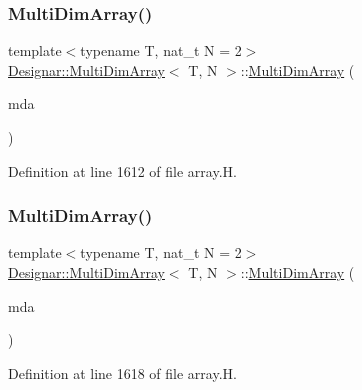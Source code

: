 \subsubsection{\texorpdfstring{Multi\+Dim\+Array()}{MultiDimArray()}\hspace{0.1cm}{\footnotesize\ttfamily [3/4]}}
{\footnotesize\ttfamily template$<$typename T, nat\+\_\+t N = 2$>$ \\
\hyperlink{class_designar_1_1_multi_dim_array}{Designar\+::\+Multi\+Dim\+Array}$<$ T, N $>$\+::\hyperlink{class_designar_1_1_multi_dim_array}{Multi\+Dim\+Array} (\begin{DoxyParamCaption}\item[{const \hyperlink{class_designar_1_1_multi_dim_array}{Multi\+Dim\+Array}$<$ T, N $>$ \&}]{mda }\end{DoxyParamCaption})\hspace{0.3cm}{\ttfamily [inline]}}



Definition at line 1612 of file array.\+H.

\mbox{\label{class_designar_1_1_multi_dim_array_aaa91d894b0e4065cba28a9066c0513b8}} 
\subsubsection{\texorpdfstring{Multi\+Dim\+Array()}{MultiDimArray()}\hspace{0.1cm}{\footnotesize\ttfamily [4/4]}}
{\footnotesize\ttfamily template$<$typename T, nat\+\_\+t N = 2$>$ \\
\hyperlink{class_designar_1_1_multi_dim_array}{Designar\+::\+Multi\+Dim\+Array}$<$ T, N $>$\+::\hyperlink{class_designar_1_1_multi_dim_array}{Multi\+Dim\+Array} (\begin{DoxyParamCaption}\item[{\hyperlink{class_designar_1_1_multi_dim_array}{Multi\+Dim\+Array}$<$ T, N $>$ \&\&}]{mda }\end{DoxyParamCaption})\hspace{0.3cm}{\ttfamily [inline]}}



Definition at line 1618 of file array.\+H.



